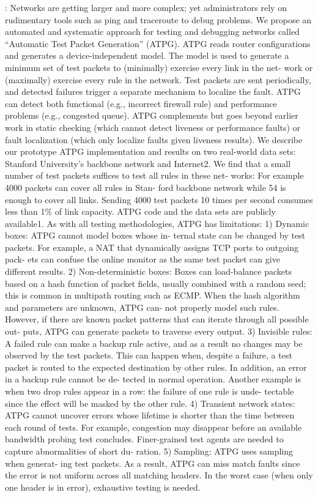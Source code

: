 \documentclass[10pt, journal, letterpaper]{IEEEtran}
\begin{document}
    
    \cite{zeng2012automatic}:  Networks are getting larger and more complex; yet administrators rely on rudimentary tools such as ping and traceroute to debug problems. We propose an automated and systematic approach for testing and debugging networks called “Automatic Test Packet Generation” (ATPG). ATPG reads router configurations and generates a device-independent model. The model is used to generate a minimum set of test packets to (minimally) exercise every link in the net- work or (maximally) exercise every rule in the network. Test packets are sent periodically, and detected failures trigger a separate mechanism to localize the fault. ATPG can detect both functional (e.g., incorrect firewall rule) and performance problems (e.g., congested queue). ATPG complements but goes beyond earlier work in static checking (which cannot detect liveness or performance faults) or fault localization (which only localize faults given liveness results). We describe our prototype ATPG implementation and results on two real-world data sets: Stanford University’s backbone network and Internet2. We find that a small number of test packets suffices to test all rules in these net- works: For example 4000 packets can cover all rules in Stan- ford backbone network while 54 is enough to cover all links. Sending 4000 test packets 10 times per second consumes less than 1$\%$ of link capacity. ATPG code and the data sets are publicly available1. 
    As with all testing methodologies, ATPG has limitations: 1) Dynamic boxes: ATPG cannot model boxes whose in- ternal state can be changed by test packets. For example, a NAT that dynamically assigns TCP ports to outgoing pack- ets can confuse the online monitor as the same test packet can give different results. 2) Non-deterministic boxes: Boxes can load-balance packets based on a hash function of packet fields, usually combined with a random seed; this is common in multipath routing such as ECMP. When the hash algorithm and parameters are unknown, ATPG can- not properly model such rules. However, if there are known packet patterns that can iterate through all possible out- puts, ATPG can generate packets to traverse every output. 3) Invisible rules: A failed rule can make a backup rule active, and as a result no changes may be observed by the test packets. This can happen when, despite a failure, a test packet is routed to the expected destination by other rules. In addition, an error in a backup rule cannot be de- tected in normal operation. Another example is when two drop rules appear in a row: the failure of one rule is unde- tectable since the effect will be masked by the other rule. 4) Transient network states: ATPG cannot uncover errors whose lifetime is shorter than the time between each round of tests. For example, congestion may disappear before an available bandwidth probing test concludes. Finer-grained test agents are needed to capture abnormalities of short du- ration. 5) Sampling: ATPG uses sampling when generat- ing test packets. As a result, ATPG can miss match faults since the error is not uniform across all matching headers. In the worst case (when only one header is in error), exhaustive testing is needed.\cite{zeng2012automatic}
\end{document}
